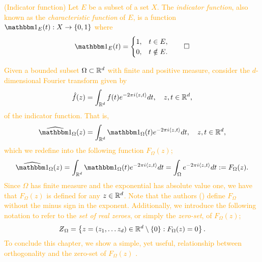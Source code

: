 \documentclass[../thesis.tex]{subfiles}
\begin{document}
\textcolor{orange}{  %
\begin{definition}(Indicator function)\label{def:indicator}
    Let $E$ be a subset of a set $X$. The \emph{indicator function}, also known as the \emph{characteristic function} of $E$, is a function $\indicator{E}{t}: X \rightarrow \braq{0,1}$ where
    \begin{equation*}
        \indicator{E}{t}  = 
        \begin{cases} 
            1, &  t\in E,\\
            0, &  t \notin E.
        \end{cases}
        \qedhere
    \end{equation*}
\end{definition}
} %

\textcolor{orange}{  %
Given a bounded subset $\Omega\subset \mathbb{R}^d$ with finite and positive measure, consider the $d$-dimensional Fourier transform given by
\begin{equation*}
    \hat{f}(z) = \int_{\mathbb{R}^d} f(t)  e^{-2\pi i \langle z,t\rangle} dt, \quad z,t\in \mathbb{R}^d,
\end{equation*}
of the indicator function. That is, 
\begin{equation*}
    \indicatorFourier{\Omega}{z} = \int_{\R^d} \indicator{\Omega}{t}  e^{-2\pi i \braa{z,t}} dt, \quad z,t\in \R^d,
\end{equation*} 
which we redefine into the following function $F_{\Omega}(z)$;
\begin{equation}\label{eq:f_omega}
    \indicatorFourier{\Omega}{z} = \int_{\R^d} \indicator{\Omega}{t}  e^{-2\pi i \braa{z,t}} dt = \int_{\Omega} e^{-2\pi i \braa{z,t}} dt := F_{\Omega}(z).
\end{equation}
Since $\Omega$ has finite measure and the exponential has absolute value one, we have that $F_{\Omega}(z)$ is defined for any $z \in \mathbb{R}^d$. Note that the authors (\cite{jorgensenSpectralPairsCartesian2001}) define $F_{\Omega}$ without the minus sign in the exponent. Additionally, we introduce the following notation to refer to the \emph{set of real zeroes}, or simply the \emph{zero-set}, of $F_{\Omega}(z)$;
\begin{equation*}
    \Zstroke_{\Omega} = \braqMed{ z  = (z_1, \dots z_d) \in \R^d \setminus \braqMed{0} : F_{\Omega}(z)= 0}.
\end{equation*}
To conclude this chapter, we show a simple, yet useful, relationship between orthogonality and the zero-set of $F_{\Omega}(z)$ \cite{lagariasOrthonormalBasesExponentials2000,jorgensenSpectralPairsCartesian2001}. %
} %
\end{document}
